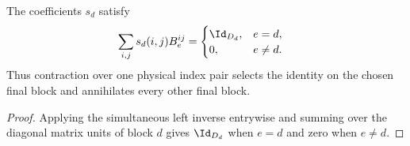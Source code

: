 \begin{lemma}
    \label{lem:mpdo_complete_zipper_final_block_selector}
    \leanok
    The coefficients $s_d$ satisfy
    \begin{align}
        \sum_{i,j}s_d(i,j)B_e^{ij}
         & =
        \begin{cases}
            \Id_{D_d}, & e=d,    \\
            0,         & e\ne d.
        \end{cases} \notag
    \end{align}
    Thus contraction over one physical index pair selects the identity on
    the chosen final block and annihilates every other final block.
\end{lemma}
\begin{proof}\leanok
    Applying the simultaneous left inverse entrywise and summing over the
    diagonal matrix units of block $d$ gives $\Id_{D_d}$ when $e=d$ and zero
    when $e\ne d$.
\end{proof}

